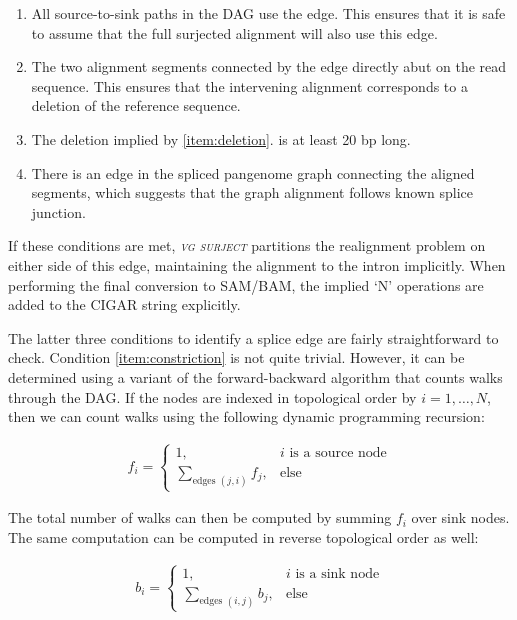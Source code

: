 \documentclass[11pt]{ucthesis}
\newcommand{\tool}[1]{\emph{\textsc{#1}}}
\begin{document}
\begin{enumerate}
\item All source-to-sink paths in the DAG use the edge. This ensures that it is safe to assume that the full surjected alignment will also use this edge. \label{item:constriction}
\item The two alignment segments connected by the edge directly abut on the read sequence. This ensures that the intervening alignment corresponds to a deletion of the reference sequence. \label{item:deletion}
\item The deletion implied by \ref{item:deletion}. is at least 20 bp long.
\item There is an edge in the spliced pangenome graph connecting the aligned segments, which suggests that the graph alignment follows known splice junction.
\end{enumerate}

\noindent If these conditions are met, \tool{vg surject} partitions the realignment problem on either side of this edge, maintaining the alignment to the intron implicitly. When performing the final conversion to SAM/BAM, the implied `N' operations are added to the CIGAR string explicitly.

The latter three conditions to identify a splice edge are fairly straightforward to check. Condition \ref{item:constriction} is not quite trivial. However, it can be determined using a variant of the forward-backward algorithm that counts walks through the DAG. If the nodes are indexed in topological order by $i = 1,\ldots,N$, then we can count walks using the following dynamic programming recursion:

\begin{align}
f_i = \begin{cases}
1,& i\text{ is a source node} \\
\sum_{\text{edges }(j,i)}f_j,& \text{else}
\end{cases}
\end{align}

\noindent The total number of walks can then be computed by summing $f_i$ over sink nodes. The same computation can be computed in reverse topological order as well:

\begin{align}
b_i = \begin{cases}
1,& i\text{ is a sink node} \\
\sum_{\text{edges }(i,j)}b_j,& \text{else}
\end{cases}
\end{align}
\end{document}
